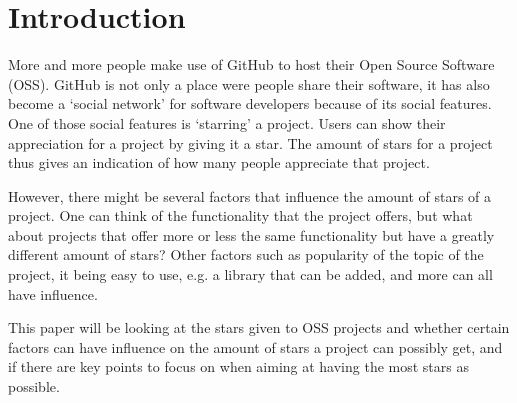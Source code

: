 \section{Introduction}
    More and more people make use of GitHub to host their Open Source Software (OSS)\cite{github-2013}. 
    GitHub is not only a place were people share their software, it has also become a `social network' for software developers because of its social features. \cite{dabbish-2012} 
    One of those social features is `starring' a project. Users can show their appreciation for a project by giving it a  star. The amount of stars for a project thus gives an indication of how many people appreciate that project.
    
    However, there might be several factors that influence the amount of stars of a project. 
    One can think of the functionality that the project offers, but what about projects that offer more or less the same functionality but have a greatly different amount of stars? Other factors such as popularity of the topic of the project, it being easy to use, e.g. a library that can be added, and more can all have influence.
    
    This paper will be looking at the stars given to OSS projects and whether certain factors can have influence on the amount of stars a project can possibly get, and if there are key points to focus on when aiming at having the most stars as possible.





